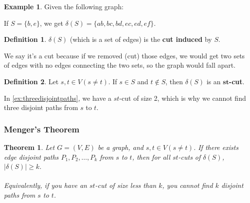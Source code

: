 \documentclass[]{article}
\newtheorem*{theorem}{Theorem}
\theoremstyle{definition}
\newtheorem*{defn}{Definition}
\newtheorem{ex}{Example}[section]
\begin{document}
			\begin{ex}
				Given the following graph:
				\begin{center}
				\end{center}
				
				If $S = \{b, e\}$, we get $\delta(S) = \{ab, bc, bd, ec, ed, ef\}$.
			\end{ex}
			
			\begin{defn}
				$\delta(S)$ (which is a set of edges) is the \textbf{cut induced} by $S$.
			\end{defn}
			
			We say it's a cut because if we removed (cut) those edges, we would get two sets of edges with no edges connecting the two sets, so the graph would fall apart.
			
			\begin{defn}
				Let $s, t \in V (s \ne t)$. If $s \in S$ and $t \not \in S$, then $\delta(S)$ is an \textbf{$\boldsymbol{st}$-cut}.
			\end{defn}
			
			In \ref{ex:threedisjointpaths}, we have a $st$-cut of size 2, which is why we cannot find three disjoint paths from $s$ to $t$.

			\subsubsection{Menger's Theorem}
				\begin{theorem}
					Let $G = (V, E)$ be a graph, and $s, t \in V (s \ne t)$. If there exists edge disjoint paths $P_1, P_2, \ldots, P_k$ from $s$ to $t$, then for all $st$-cuts of $\delta(S)$, $|\delta(S)| \ge k$.
					\\ \\
					Equivalently, if you have an $st$-cut of size less than $k$, you cannot find $k$ disjoint paths from $s$ to $t$.
				\end{theorem}
			
\end{document}
